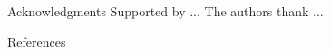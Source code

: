 \documentclass[aspectratio=169,xcolor=dvipsnames]{beamer}
\begin{document}
\begin{frame}{Acknowledgments}
  Supported by ... The authors thank ...
\end{frame}

\begin{frame}[allowframebreaks]{References}
  \scriptsize
  
  
\end{frame}


\end{document}
